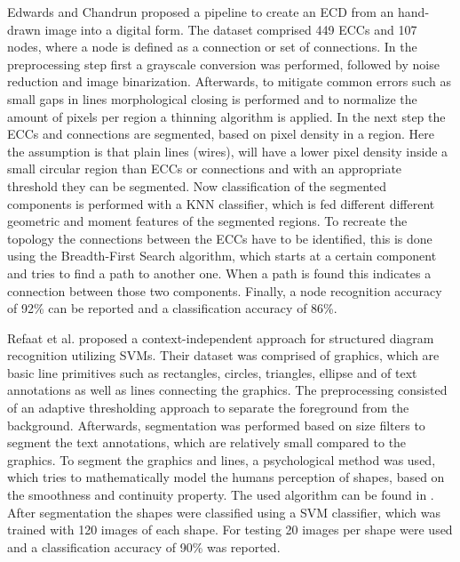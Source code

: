 Edwards and Chandrun proposed a pipeline to create an \ac{ECD} from an hand-drawn image into a digital form.
The dataset comprised 449 \acp{ECC} and 107 nodes, where a node is defined as a connection or set of connections.
In the preprocessing step first a grayscale conversion was performed, followed by noise reduction and image binarization.
Afterwards, to mitigate common errors such as small gaps in lines morphological closing is performed and to normalize the amount of pixels per region a thinning algorithm is applied.
In the next step the \acp{ECC} and connections are segmented, based on pixel density in a region.
Here the assumption is that plain lines (wires), will have a lower pixel density inside a small circular region than \acp{ECC} or connections and with an appropriate threshold they can be segmented.
Now classification of the segmented components is performed with a \ac{KNN} classifier, which is fed different different geometric and moment features of the segmented regions.
To recreate the topology the connections between the \acp{ECC} have to be identified, this is done using the Breadth-First Search algorithm, which starts at a certain component and tries to find a path to another one.
When a path is found this indicates a connection between those two components.
Finally, a node recognition accuracy of 92\% can be reported and a classification accuracy of 86\%.

Refaat et al. \cite{ecd_ctxindependentsvm} proposed a context-independent approach for structured diagram recognition utilizing \acp{SVM}.
Their dataset was comprised of graphics, which are basic line primitives such as rectangles, circles, triangles, ellipse and of text annotations as well as lines connecting the graphics.
The preprocessing consisted of an adaptive thresholding approach to separate the foreground from the background.
Afterwards, segmentation was performed based on size filters to segment the text annotations, which are relatively small compared to the graphics.
To segment the graphics and lines, a psychological method was used, which tries to mathematically model the humans perception of shapes, based on the smoothness and continuity property.
The used algorithm can be found in \cite{line_primitive}.
After segmentation the shapes were classified using a \ac{SVM} classifier, which was trained with 120 images of each shape.
For testing 20 images per shape were used and a classification accuracy of 90\% was reported.

